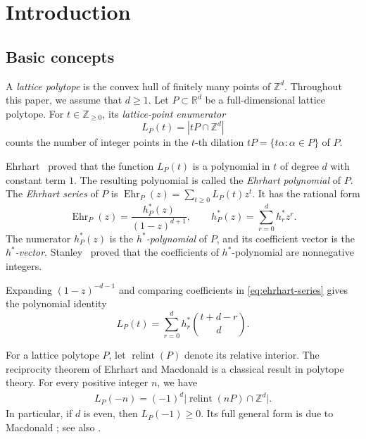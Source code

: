 \documentclass[reqno, 12pt]{article}
\numberwithin{equation}{section}
\theoremstyle{definition}
\newcommand{\R}{\mathbb{R}}
\newcommand{\Z}{\mathbb{Z}}
\newcommand{\N}{\mathbb{Z}_{\geq 0}}
\newcommand{\relint}{\operatorname{relint}}
\begin{document}
\tableofcontents

\section{Introduction}

\subsection{Basic concepts}

A \emph{lattice polytope} is the convex hull of finitely many points of $\Z^d$.
Throughout this paper, we assume that $d\geq 1$.
Let $P\subset\R^d$ be a full-dimensional lattice polytope.  
For $t\in\N$, its \emph{lattice-point enumerator}
\[ L_P(t)=|tP\cap\Z^d|\]
counts the number of integer points in the $t$-th dilation $tP = \{ t\alpha : \alpha \in P \}$ of $P$.

Ehrhart~\cite{Ehrhart1962} proved that the function $L_P(t)$ is a polynomial in $t$ of degree $d$ with constant term $1$.
The resulting polynomial is called the \emph{Ehrhart polynomial} of $P$.
The \emph{Ehrhart series} of $P$ is $\operatorname{Ehr}_P(z)=\sum_{t\geq0}L_P(t)z^t$.
It has the rational form
\begin{equation}\label{eq:ehrhart-series}
\operatorname{Ehr}_P(z)=\frac{h_P^*(z)}{(1-z)^{d+1}},\qquad h_P^*(z)=\sum_{r=0}^{d}h_r^*z^r.
\end{equation}
The numerator $h_P^*(z)$ is the \emph{$h^*$-polynomial} of $P$, and its coefficient vector is the \emph{$h^*$-vector}. 
Stanley~\cite{Stanley1980} proved that the coefficients of $h^*$-polynomial are nonnegative integers.


Expanding $(1-z)^{-d-1}$ and comparing coefficients in \eqref{eq:ehrhart-series} gives the polynomial identity
\begin{equation}\label{eq:hstar-expansion}
  L_P(t)=\sum_{r=0}^{d}h_r^*\binom{t+d-r}{d}.
\end{equation}


For a lattice polytope $P$, let $\relint(P)$ denote its relative interior. 
The reciprocity theorem of Ehrhart and Macdonald is a classical result in polytope theory. 
For every positive integer $n$, we have 
\begin{align}\label{thm:reciprocity}
L_P(-n)=(-1)^d\bigl|\relint(nP)\cap\Z^d\bigr|.
\end{align} 
In particular, if $d$ is even, then $L_P(-1)\geq0$.
Its full general form is due to Macdonald \cite{Macdonald1971}; see also \cite[Theorem~4.1]{BeckRobins2015}.
\end{document}
